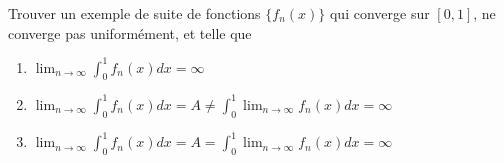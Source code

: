 

\begin{exercice}\label{exo117}

Trouver un exemple de suite de fonctions $\{ f_n(x) \}$ qui converge sur $[0,1]$, ne converge pas uniformément, et telle que

\begin{enumerate}
\item $\lim_{n\to\infty}\int_0^1f_n(x)dx=\infty$
\item $\lim_{n\to\infty}\int_0^1f_n(x)dx=A\neq\int_0^1\lim_{n\to\infty}f_n(x)dx=\infty$
\item $\lim_{n\to\infty}\int_0^1f_n(x)dx=A=\int_0^1\lim_{n\to\infty}f_n(x)dx=\infty$
\end{enumerate}

\end{exercice}
